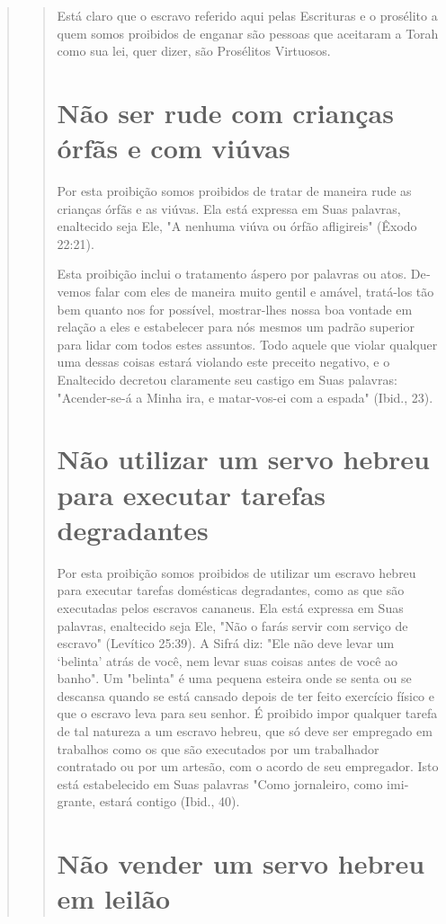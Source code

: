 \begin{quote}
\begin{quote}
Está claro que o escravo referido aqui pelas Escrituras e o prosélito a
quem somos proibidos de enganar são pessoas que aceitaram a Torah como
sua lei, quer dizer, são Prosélitos Virtuosos.

\section{Não ser rude com crianças órfãs e com viúvas}

Por esta proibição somos proibidos de tratar de maneira rude as
crian­ças órfãs e as viúvas. Ela está expressa em Suas palavras,
enaltecido seja Ele, "A nenhuma viúva ou órfão afligireis" (Êxodo
22:21).

Esta proibição inclui o tratamento áspero por palavras ou atos. De­vemos
falar com eles de maneira muito gentil e amável, tratá-los tão bem
quan­to nos for possível, mostrar-lhes nossa boa vontade em relação a
eles e estabe­lecer para nós mesmos um padrão superior para lidar com
todos estes assun­tos. Todo aquele que violar qualquer uma dessas coisas
estará violando este preceito negativo, e o Enaltecido decretou
claramente seu castigo em Suas pa­lavras: "Acender-se-á a Minha ira, e
matar-vos-ei com a espada" (Ibid., 23).

\section{Não utilizar um servo hebreu para executar tarefas degradantes}

Por esta proibição somos proibidos de utilizar um escravo hebreu para
executar tarefas domésticas degradantes, como as que são executadas
pe­los escravos cananeus. Ela está expressa em Suas palavras, enaltecido
seja Ele, "Não o farás servir com serviço de escravo" (Levítico 25:39).
A Sifrá diz: "Ele não deve levar um `belinta' atrás de você, nem levar
suas coisas antes de você ao banho". Um "belinta" é uma pequena esteira
onde se senta ou se descansa quando se está cansado depois de ter feito
exercício físico e que o escravo leva para seu senhor. É proibido impor
qualquer tarefa de tal natureza a um escravo hebreu, que só deve ser
empregado em trabalhos como os que são executados por um trabalhador
contratado ou por um artesão, com o acordo de seu em­pregador. Isto está
estabelecido em Suas palavras "Como jornaleiro, como imi­grante, estará
contigo (Ibid., 40).

\section{Não vender um servo hebreu em leilão}


\end{quote}
\end{quote}

